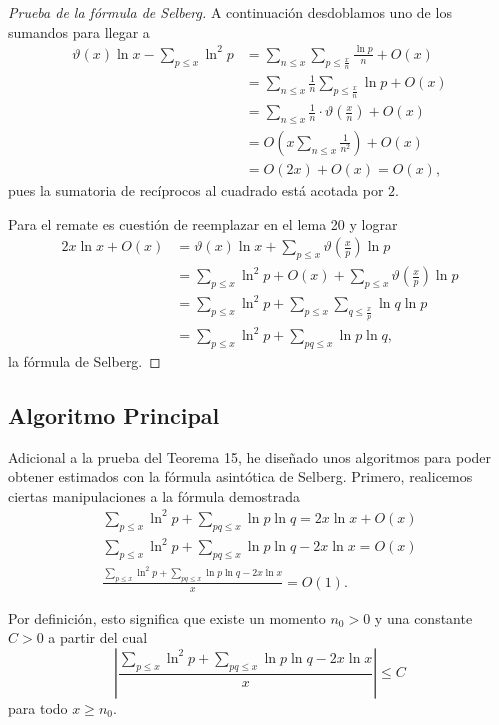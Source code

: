 \documentclass[10pt]{article}
\theoremstyle{definition}
\theoremstyle{remark}
\begin{document}
\begin{proof}[Prueba de la f\'ormula de Selberg]
A continuaci\'on desdoblamos uno de los sumandos para llegar a 
\begin{align*}
\vartheta(x)\ln x - \sum_{p \leq x} \ln^2 p &= \sum_{n \leq x} \sum_{p \leq \frac{x}{n}} \frac{\ln p}{n} + O(x) \\
&= \sum_{n \leq x} \frac{1}{n}\sum_{p \leq \frac{x}{n}} \ln p + O(x) \\
&= \sum_{n \leq x} \frac{1}{n}\cdot \vartheta\left(\frac{x}{n}\right) + O(x) \\
&= O\left(x \sum_{n \leq x} \frac{1}{n^2}\right) + O(x) \\
&= O(2x)+O(x)=O(x), 
\end{align*}
pues la sumatoria de rec\'iprocos al cuadrado est\'a acotada por $2$. 

Para el remate es cuesti\'on de reemplazar en el lema 20 y lograr  
\begin{align*}
2x\ln x + O(x) &= \vartheta(x)\ln x + \sum_{p \leq x} \vartheta\left(\frac{x}{p}\right)\ln p  \\
&= \sum_{p \leq x} \ln^2 p + O(x) + \sum_{p \leq x} \vartheta\left(\frac{x}{p}\right)\ln p  \\
&= \sum_{p \leq x} \ln^2 p + \sum_{p \leq x} \sum_{q \leq \frac{x}{p}} \ln q \ln p  \\
&= \sum_{p \leq x} \ln^2 p + \sum_{pq \leq x} \ln p \ln q, 
\end{align*}
la f\'ormula de Selberg.
\end{proof}

\subsection{Algoritmo Principal}
Adicional a la prueba del Teorema 15, he dise\~nado unos algoritmos para poder obtener estimados
con la f\'ormula asint\'otica de Selberg. Primero, realicemos ciertas manipulaciones a la f\'ormula demostrada
\begin{gather*}
\sum_{p \leq x} \ln^2 p + \sum_{pq \leq x} \ln p \ln q = 2x\ln x + O(x) \\
\sum_{p \leq x} \ln^2 p + \sum_{pq \leq x} \ln p \ln q - 2x\ln x = O(x) \\
\frac{\sum_{p \leq x} \ln^2 p + \sum_{pq \leq x} \ln p \ln q - 2x\ln x}{x} = O(1).
\end{gather*}

Por definici\'on, esto significa que existe un momento $n_0 > 0$ y una constante $C > 0$ a partir del cual
$$\left|\frac{\sum_{p \leq x} \ln^2 p + \sum_{pq \leq x} \ln p \ln q - 2x\ln x}{x}\right| \leq C$$
para todo $x \geq n_0$.
\end{document}
